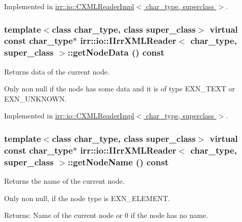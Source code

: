 Implemented in \hyperlink{classirr_1_1io_1_1_c_x_m_l_reader_impl_f8ff476656b98b9f491b453c8093b77b}{irr::io::CXMLReaderImpl$<$ char\_\-type, superclass $>$}.\hypertarget{classirr_1_1io_1_1_i_irr_x_m_l_reader_ecbe0698e8f9acf88e27dd53da984210}{
\subsubsection[{getNodeData}]{\setlength{\rightskip}{0pt plus 5cm}template$<$class char\_\-type, class super\_\-class$>$ virtual const char\_\-type$\ast$ {\bf irr::io::IIrrXMLReader}$<$ char\_\-type, super\_\-class $>$::getNodeData () const}}
\label{classirr_1_1io_1_1_i_irr_x_m_l_reader_ecbe0698e8f9acf88e27dd53da984210}


Returns data of the current node. 

Only non null if the node has some data and it is of type EXN\_\-TEXT or EXN\_\-UNKNOWN. 

Implemented in \hyperlink{classirr_1_1io_1_1_c_x_m_l_reader_impl_c661ef32418a004c1ec3b6e02c9615df}{irr::io::CXMLReaderImpl$<$ char\_\-type, superclass $>$}.\hypertarget{classirr_1_1io_1_1_i_irr_x_m_l_reader_7d745b130c895d0f910f191d04e20e87}{
\subsubsection[{getNodeName}]{\setlength{\rightskip}{0pt plus 5cm}template$<$class char\_\-type, class super\_\-class$>$ virtual const char\_\-type$\ast$ {\bf irr::io::IIrrXMLReader}$<$ char\_\-type, super\_\-class $>$::getNodeName () const}}
\label{classirr_1_1io_1_1_i_irr_x_m_l_reader_7d745b130c895d0f910f191d04e20e87}


Returns the name of the current node. 

Only non null, if the node type is EXN\_\-ELEMENT. \begin{Desc}
\item[Returns:]Name of the current node or 0 if the node has no name. \end{Desc}


